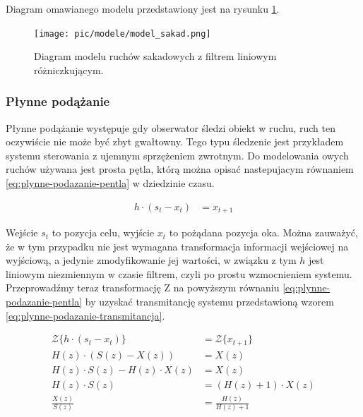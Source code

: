 \documentclass[a4paper,twoside,12pt]{book}
\begin{document}
Diagram omawianego modelu przedstawiony jest na rysunku \ref{fig:model-sakad}.

\begin{figure}[htbp]
	\centering
	\texttt{[image: pic/modele/model\_sakad.png]}
	\caption{Diagram modelu ruchów sakadowych z filtrem liniowym różniczkującym.}
	\label{fig:model-sakad}
\end{figure}

\subsubsection{Płynne podążanie}
\label{subsubsec:plynne-podazanie}

Płynne podążanie występuje gdy obserwator śledzi obiekt w ruchu, ruch ten oczywiście nie może być zbyt gwałtowny. Tego typu śledzenie jest przykładem systemu sterowania z ujemnym sprzężeniem zwrotnym. Do modelowania owych ruchów używana jest prosta pętla, którą można opisać nastepujacym równaniem \ref{eq:plynne-podazanie-pentla} w dziedzinie czasu.

\begin{align}
	h \cdot (s_t - x_t) &= x_{t+1} 
	\label{eq:plynne-podazanie-pentla}
\end{align}

Wejście $s_t$ to pozycja celu, wyjście $x_t$ to pożądana pozycja oka. Można zauważyć, że w tym przypadku nie jest wymagana transformacja informacji wejściowej na wyjściową, a jedynie zmodyfikowanie jej wartości, w związku z tym $h$ jest liniowym niezmiennym w czasie filtrem, czyli po prostu wzmocnieniem systemu. Przeprowadźmy teraz transformację Z na powyższym równaniu \ref{eq:plynne-podazanie-pentla} by uzyskać transmitancję systemu przedstawioną wzorem \ref{eq:plynne-podazanie-transmitancja}.

\begin{align} %
	\mathcal{Z}\{h \cdot (s_t - x_t)\} &= \mathcal{Z}\{x_{t+1}\} \nonumber \\
	H(z) \cdot (S(z) - X(z)) &=  X(z) \nonumber \\ %
	H(z) \cdot S(z) - H(z) \cdot X(z) &=  X(z) \nonumber \\
	H(z) \cdot S(z) &= (H(z) + 1) \cdot X(z) \nonumber \\
	\frac{X(z)}{S(z)} &= \frac{H(z)}{H(z) + 1} \label{eq:plynne-podazanie-transmitancja}
\end{align}   %
\end{document}
